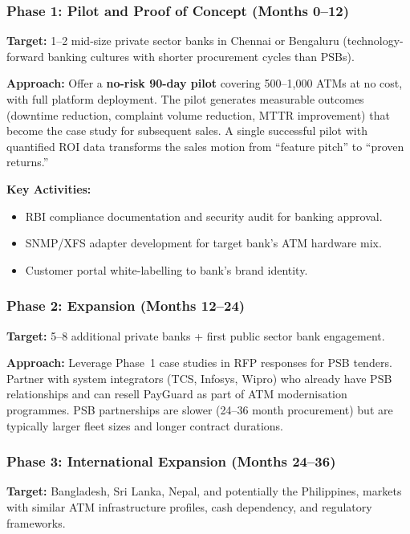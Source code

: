 \documentclass[12pt,a4paper]{article}
\begin{document}
\subsubsection{Phase 1: Pilot and Proof of Concept (Months 0--12)}

\textbf{Target:} 1--2 mid-size private sector banks in Chennai or Bengaluru (technology-forward
banking cultures with shorter procurement cycles than PSBs).

\textbf{Approach:} Offer a \textbf{no-risk 90-day pilot} covering 500--1,000 ATMs at no cost,
with full platform deployment. The pilot generates measurable outcomes (downtime reduction,
complaint volume reduction, MTTR improvement) that become the case study for subsequent
sales. A single successful pilot with quantified ROI data transforms the sales motion from
``feature pitch'' to ``proven returns.''

\textbf{Key Activities:}
\begin{itemize}
  \item RBI compliance documentation and security audit for banking approval.
  \item SNMP/XFS adapter development for target bank's ATM hardware mix.
  \item Customer portal white-labelling to bank's brand identity.
\end{itemize}

\subsubsection{Phase 2: Expansion (Months 12--24)}

\textbf{Target:} 5--8 additional private banks + first public sector bank engagement.

\textbf{Approach:} Leverage Phase~1 case studies in RFP responses for PSB tenders. Partner
with system integrators (TCS, Infosys, Wipro) who already have PSB relationships and can
resell PayGuard as part of ATM modernisation programmes. PSB partnerships are slower (24--36
month procurement) but are typically larger fleet sizes and longer contract durations.

\subsubsection{Phase 3: International Expansion (Months 24--36)}

\textbf{Target:} Bangladesh, Sri Lanka, Nepal, and potentially the Philippines, markets
with similar ATM infrastructure profiles, cash dependency, and regulatory frameworks.
\end{document}
